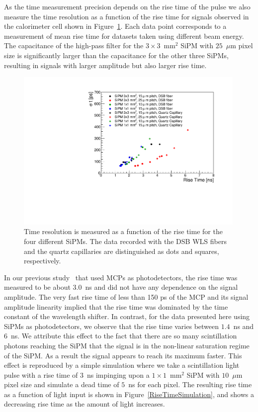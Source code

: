 As the time measurement precision depends on the rise time of the pulse we also
measure the time resolution as a function of the rise time for signals observed
in the calorimeter cell shown in Figure~\ref{RiseTime}. Each data point corresponds
to a measurement of mean rise time for datasets taken using different beam energy.
The capacitance of the high-pass filter for the 
$3\times3$~$\mathrm{mm}^{2}$ SiPM with $25$~$\mu$m pixel size is significantly 
larger than the capacitance for the other three SiPMs, resulting in signals with 
larger amplitude but also larger rise time.

\begin{figure}[!htb]
\centering
\includegraphics[width=0.99\textwidth]{figures/ShashlikTimeResolutionVsRiseTime.pdf}
\caption{\label{RiseTime}Time resolution is measured as a function of the rise time
for the four different SiPMs. The data recorded with the DSB WLS fibers and the
quartz capillaries are distinguished as dots and squares, respectively. }
\end{figure}

In our previous study~\cite{Anderson:2015gha} that used MCPs as photodetectors,
the rise time was measured to be about $3.0$~ns and did not have any dependence
on the signal amplitude. The very fast rise time of less than 150 ps of the MCP
and its signal amplitude linearity implied that the rise time was dominated by
the time constant of the wavelength shifter. In contrast, for the data presented
here using SiPMs as photodetectors, we observe that the rise time varies between
$1.4$~ns and $6$~ns. We attribute this effect to the fact that
there are so many scintillation photons reaching the SiPM that the signal is in
the non-linear saturation regime of the SiPM. As a result the signal appears to reach
its maximum faster. This effect is reproduced by a simple simulation where we 
take a scintillation light pulse with a rise time of $3$~ns impinging upon a
$1\times1$~$\mathrm{mm}^{2}$ SiPM with $10$~$\mu$m pixel size and 
simulate a dead time of $5$~ns for each pixel. The resulting rise time as a function
of light input is shown in Figure~\ref{RiseTimeSimulation}, and shows a 
decreasing rise time as the amount of light increases.


